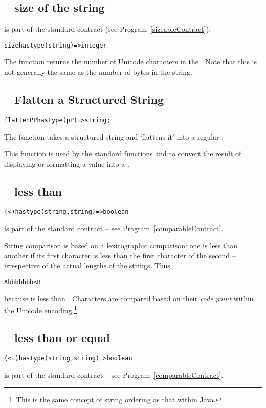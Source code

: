 \subsection{ -- size of the string}
\label{stringSizeFunction}
 is part of the standard  contract (see Program~\vref{sizeableContract}):
\begin{alltt}
size has type (string)=>integer
\end{alltt}
The  function returns the number of Unicode characters in the . Note that this is not generally the same as the number of bytes in the string.

\subsection{ -- Flatten a Structured String}
\begin{alltt}
flattenPP has type (pP)=>string;
\end{alltt}
The  function takes a structured string and `flattens it' into a regular .

\begin{aside}
This function is used by the standard functions  and  to convert the result of displaying or formatting a value into a .
\end{aside}

\subsection{\q{<} -- less than}
\begin{alltt}
(<) has type (string,string)=>boolean
\end{alltt}
\q{(<)} is part of the standard  contract -- see Program~\vref{comparableContract}.

String comparison is based on a lexicographic comparison: one  is less than another if its first character is less than the first character of the second -- irrespective of the actual lengths of the strings. Thus
\begin{alltt}
Abbbbbbb < B
\end{alltt}
because  is less than . Characters are compared based on their \emph{code point} within the Unicode encoding.\footnote{This is the same concept of string ordering as that within Java\tm.}

\subsection{\q{<=} -- less than or equal}
\begin{alltt}
(<=) has type (string,string)=>boolean
\end{alltt}
\q{(<=)} is part of the standard  contract -- see Program~\vref{comparableContract}.

